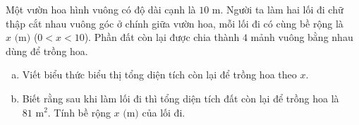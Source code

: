 \begin{bt}%
Một vườn hoa hình vuông có độ dài cạnh là $10\text{ m}$. Người ta làm hai lối đi chữ thập cắt nhau vuông góc ở chính giữa vườn hoa, mỗi lối đi có cùng bề rộng là $x\text{ (m)}$ ($0 < x < 10$). Phần đất còn lại được chia thành $4$ mảnh vuông bằng nhau dùng để trồng hoa.
\begin{enumerate}[a)]
	\item Viết biểu thức biểu thị tổng diện tích còn lại để trồng hoa theo $x$.
	\item Biết rằng sau khi làm lối đi thì tổng diện tích đất còn lại để trồng hoa là $81\text{ m}^2$. Tính bề rộng $x\text{ (m)}$ của lối đi.
\end{enumerate}
\end{bt}

